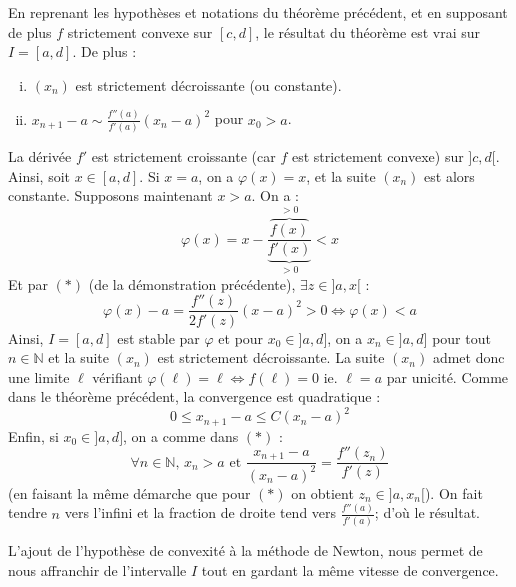 	\begin{corollary}
		En reprenant les hypothèses et notations du théorème précédent, et en supposant de plus $f$ strictement convexe sur $[c, d]$, le résultat du théorème est vrai sur $I = [a, d]$. De plus :
		\begin{enumerate}[(i)]
			\item $(x_n)$ est strictement décroissante (ou constante).
			\item $x_{n+1} - a \sim \frac{f''(a)}{f'(a)} (x_n - a)^2$ pour $x_0 > a$.
		\end{enumerate}
	\end{corollary}
	
	\begin{demonstration}
		La dérivée $f'$ est strictement croissante (car $f$ est strictement convexe) sur $]c, d[$. Ainsi, soit $x \in [a, d]$. Si $x = a$, on a $\varphi(x) = x$, et la suite $(x_n)$ est alors constante. Supposons maintenant $x > a$. On a :
		\[ \varphi(x) = x - \frac{\overbrace{f(x)}^{> 0}}{\underbrace{f'(x)}_{> 0}} < x \]
		Et par $(*)$ (de la démonstration précédente), $\exists z \in ]a, x[$ :
		\[ \varphi(x) - a = \frac{f''(z)}{2f'(z)} (x-a)^2 > 0 \iff \varphi(x) < a \]
		Ainsi, $I = [a, d]$ est stable par $\varphi$ et pour $x_0 \in ]a, d]$, on a $x_n \in ]a, d]$ pour tout $n \in \mathbb{N}$ et la suite $(x_n)$ est strictement décroissante. La suite $(x_n)$ admet donc une limite $\ell$ vérifiant $\varphi(\ell) = \ell \iff f(\ell) = 0$ ie. $\ell = a$ par unicité. Comme dans le théorème précédent, la convergence est quadratique :
		\[ 0 \leq x_{n+1} - a \leq C (x_n - a)^2 \]
		Enfin, si $x_0 \in ]a, d]$, on a comme dans $(*)$ :
		\[ \forall n \in \mathbb{N}, \, x_n > a \text{ et } \frac{x_{n+1} - a}{(x_n - a)^2} = \frac{f''(z_n)}{f'(z)} \]
		(en faisant la même démarche que pour $(*)$ on obtient $z_n \in ]a, x_n[$). On fait tendre $n$ vers l'infini et la fraction de droite tend vers $\frac{f''(a)}{f'(a)}$; d'où le résultat.
	\end{demonstration}

	\begin{remark}
		L'ajout de l'hypothèse de convexité à la méthode de Newton, nous permet de nous affranchir de l'intervalle $I$ tout en gardant la même vitesse de convergence.
	\end{remark}

